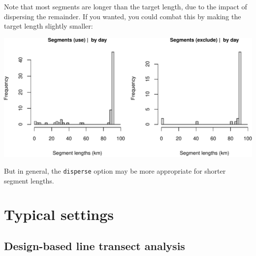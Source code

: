 \documentclass[
]{book}
\newenvironment{Shaded}{\begin{snugshade}}{\end{snugshade}}
\newcommand{\CommentTok}[1]{\textcolor[rgb]{0.56,0.35,0.01}{\textit{#1}}}
\newcommand{\DataTypeTok}[1]{\textcolor[rgb]{0.13,0.29,0.53}{#1}}
\newcommand{\DecValTok}[1]{\textcolor[rgb]{0.00,0.00,0.81}{#1}}
\newcommand{\KeywordTok}[1]{\textcolor[rgb]{0.13,0.29,0.53}{\textbf{#1}}}
\newcommand{\NormalTok}[1]{#1}
\newcommand{\OperatorTok}[1]{\textcolor[rgb]{0.81,0.36,0.00}{\textbf{#1}}}
\newcommand{\OtherTok}[1]{\textcolor[rgb]{0.56,0.35,0.01}{#1}}
\newcommand{\StringTok}[1]{\textcolor[rgb]{0.31,0.60,0.02}{#1}}
\begin{document}
Note that most segments are longer than the target length, due to the impact of dispersing the remainder. If you wanted, you could combat this by making the target length slightly smaller:

\begin{Shaded}
\end{Shaded}

\includegraphics{figures/unnamed-chunk-274-1.pdf}

But in general, the \texttt{disperse} option may be more appropriate for shorter segment lengths.

\hypertarget{typical-settings}{%
\section*{Typical settings}\label{typical-settings}}

\hypertarget{design-based-line-transect-analysis}{%
\subsection*{Design-based line transect analysis}\label{design-based-line-transect-analysis}}
\end{document}
